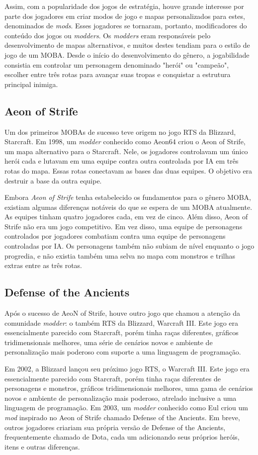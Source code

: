 Assim, com a popularidade dos jogos de estratégia, houve grande interesse por parte dos jogadores em criar modos de jogo e mapas personalizados para estes, denominados de \textit{mods}. Esses jogadores se tornaram, portanto, modificadores do conteúdo dos jogos ou \textit{modders}. Os \textit{modders} eram responsáveis pelo desenvolvimento de mapas alternativos, e muitos destes tendiam para o estilo de jogo de um MOBA. Desde o início do desenvolvimento do gênero, a jogabilidade consistia em controlar um personagem denominado "herói" ou "campeão", escolher entre três rotas para avançar suas tropas e conquistar a estrutura principal inimiga.

\subsection{Aeon of Strife}
Um dos primeiros MOBAs de sucesso teve origem no jogo RTS da Blizzard, Starcraft. Em 1998, um \textit{modder} conhecido como Aeon64 criou o Aeon of Strife, um mapa alternativo para o Starcraft. Nele, os jogadores controlavam um único herói cada e lutavam em uma equipe contra outra controlada por IA em três rotas do mapa. Essas rotas conectavam as bases das duas equipes. O objetivo era destruir a base da outra equipe.

Embora \textit{Aeon of Strife} tenha estabelecido os fundamentos para o gênero MOBA, existiam algumas diferenças notáveis do que se espera de um MOBA atualmente. As equipes tinham quatro jogadores cada, em vez de cinco. Além disso, Aeon of Strife não era um jogo competitivo. Em vez disso, uma equipe de personagens controlados por jogadores combatiam contra uma equipe de personagens controladas por IA. Os personagens também não subiam de nível enquanto o jogo progredia, e não existia também uma selva no mapa com monstros e trilhas extras entre as três rotas.

\subsection{Defense of the Ancients}
Após o sucesso de AeoN of Strife, houve outro jogo que chamou a atenção da comunidade \textit{modder}: o também RTS da Blizzard, Warcraft III. Este jogo era essencialmente parecido com Starcraft, porém tinha raças diferentes, gráficos tridimensionais melhores, uma série de cenários novos e ambiente de personalização mais poderoso com suporte a uma linguagem de programação.

Em 2002, a Blizzard lançou seu próximo jogo RTS, o Warcraft III. Este jogo era essencialmente parecido com Starcraft, porém tinha raças diferentes de personagens e monstros, gráficos tridimensionais melhores, uma gama de cenários novos e ambiente de personalização mais poderoso, atrelado inclusive a uma linguagem de programação. Em 2003, um \textit{modder} conhecido como Eul criou um \textit{mod} inspirado no Aeon of Strife chamado Defense of the Ancients. Em breve, outros jogadores criariam sua própria versão de Defense of the Ancients, frequentemente chamado de Dota, cada um adicionando seus próprios heróis, itens e outras diferenças.

